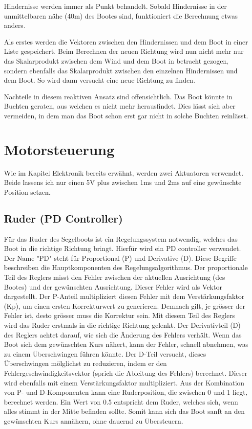 Hindernisse werden immer als Punkt behandelt. Sobald Hindernisse in der unmittelbaren nähe (40m) des Bootes sind, funktioniert die Berechnung etwas anders.

Als erstes werden die Vektoren zwischen den Hindernissen und dem Boot in einer Liste gespeichert. Beim Berechnen der neuen Richtung wird nun nicht mehr nur das Skalarprodukt zwischen dem Wind und dem Boot in betracht gezogen, sondern ebenfalls das Skalarprodukt zwischen den einzelnen Hindernissen und dem Boot. So wird dann versucht eine neue Richtung zu finden.

Nachteile in diesem reaktiven Ansatz sind offensichtlich. Das Boot könnte in Buchten geraten, aus welchen es nicht mehr herausfindet. Dies lässt sich aber vermeiden, in dem man das Boot schon erst gar nicht in solche Buchten reinlässt. 

\section{Motorsteuerung}
Wie im Kapitel Elektronik bereits erwähnt, werden zwei Aktuatoren verwendet. Beide lassens ich nur einen 5V plus zwischen 1ms und 2ms auf eine gewünschte Position setzen. 

\subsection{Ruder (PD Controller)}
Für das Ruder des Segelboots ist ein Regelungssystem notwendig, welches das Boot in die richtige Richtung bringt. Hierfür wird ein PD controller verwendet. Der Name "PD" steht für Proportional (P) und Derivative (D). Diese Begriffe beschreiben die Hauptkomponenten des Regelungsalgorithmus. Der proportionale Teil des Reglers misst den Fehler zwischen der aktuellen Ausrichtung (des Bootes) und der gewünschten Ausrichtung. Dieser Fehler wird als Vektor dargestellt. Der P-Anteil multipliziert diesen Fehler mit dem Verstärkungsfaktor (Kp), um einen ersten Korrekturwert zu generieren. Demnach gilt, je grösser der Fehler ist, desto grösser muss die Korrektur sein. Mit diesem Teil des Reglers wird das Ruder erstmals in die richtige Richtung gelenkt. Der Derivativteil (D) des Reglers achtet darauf, wie sich die Änderung des Fehlers verhält. Wenn das Boot sich dem gewünschten Kurs nähert, kann der Fehler, schnell abnehmen, was zu einem Überschwingen führen könnte. Der D-Teil versucht, dieses Überschwingen mölglichst zu reduzieren, indem er den Fehlergeschwindigkeitsvektor (sprich die Ableitung des Fehlers) berechnet. Dieser wird ebenfalls mit einem Verstärkungsfaktor multipliziert. Aus der Kombination von P- und D-Komponenten kann eine Ruderposition, die zwischen 0 und 1 liegt, berechnet werden. Ein Wert von 0.5 entspricht dem Ruder, welches sich, wenn alles stimmt in der Mitte befinden sollte. Somit kann sich das Boot sanft an den gewünschten Kurs annähern, ohne dauernd zu Übersteuern. 


